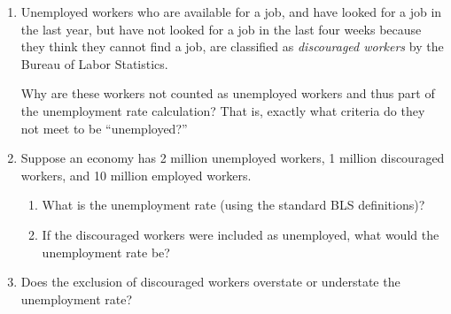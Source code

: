 \documentclass[
    letterpaper,paper=portrait,fleqn,
    DIV=16,fontsize=12pt,twoside=semi,
    parskip=full-,
    headings=standardclasses]
{scrartcl}
\begin{document}
\begin{enumerate}

\item Unemployed workers who are available for a job, and have looked for a job in the last year, but have not looked for a job in the last four weeks because they think they cannot find a job, are classified as \emph{discouraged workers} by the Bureau of Labor Statistics.

Why are these workers not counted as unemployed workers and thus part of the unemployment rate calculation? That is, exactly what criteria do they not meet to be ``unemployed?''

\vfill
\vfill

\item Suppose an economy has 2 million unemployed workers, 1 million discouraged workers, and 10 million employed workers.

\begin{enumerate}

\item What is the unemployment rate (using the standard BLS definitions)?

\vfill

\item If the discouraged workers were included as unemployed, what would the unemployment rate be?

\vfill

\end{enumerate}

\item Does the exclusion of discouraged workers overstate or understate the unemployment rate? 

\vfill
\vfill

\end{enumerate}
\end{document}
